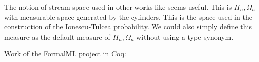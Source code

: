 
The notion of stream-space used in other works like \cite{holzl2017markov} seems useful. This is $\Pi_n, \Omega_n$ with measurable space generated by the cylinders. This is the space used in the construction of the Ionescu-Tulcea probability. We could also simply define this measure as the default measure of $\Pi_n, \Omega_n$ without using a type synonym.


Work of the FormalML project in Coq: \cite{vajjha2021certrl,vajjha2022formalization}
